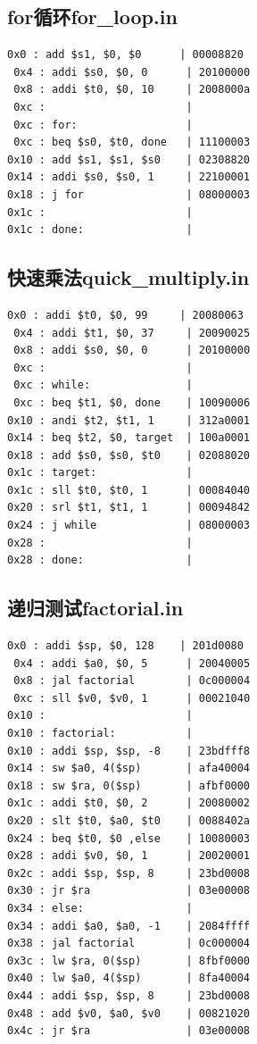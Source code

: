 \documentclass[twocolumn]{article} %
\begin{document}
\begin{sloppypar}
\subsection{for循环for\_loop.in}

\begin{lstlisting}[]   
 0x0 : add $s1, $0, $0      | 00008820
 0x4 : addi $s0, $0, 0      | 20100000
 0x8 : addi $t0, $0, 10     | 2008000a
 0xc :                      | 
 0xc : for:                 | 
 0xc : beq $s0, $t0, done   | 11100003
0x10 : add $s1, $s1, $s0    | 02308820
0x14 : addi $s0, $s0, 1     | 22100001
0x18 : j for                | 08000003
0x1c :                      | 
0x1c : done:                | 
\end{lstlisting}  

\subsection{{\color{red} 快速乘法quick\_multiply.in}}

\begin{lstlisting}[]  
 0x0 : addi $t0, $0, 99     | 20080063
 0x4 : addi $t1, $0, 37     | 20090025
 0x8 : addi $s0, $0, 0      | 20100000
 0xc :                      | 
 0xc : while:               | 
 0xc : beq $t1, $0, done    | 10090006
0x10 : andi $t2, $t1, 1     | 312a0001
0x14 : beq $t2, $0, target  | 100a0001
0x18 : add $s0, $s0, $t0    | 02088020
0x1c : target:              | 
0x1c : sll $t0, $t0, 1      | 00084040
0x20 : srl $t1, $t1, 1      | 00094842
0x24 : j while              | 08000003
0x28 :                      | 
0x28 : done:                | 
\end{lstlisting}  

\subsection{{\color{red} 递归测试factorial.in}}

\begin{lstlisting}[]  
 0x0 : addi $sp, $0, 128    | 201d0080
 0x4 : addi $a0, $0, 5      | 20040005
 0x8 : jal factorial        | 0c000004
 0xc : sll $v0, $v0, 1      | 00021040
0x10 :                      | 
0x10 : factorial:           | 
0x10 : addi $sp, $sp, -8    | 23bdfff8
0x14 : sw $a0, 4($sp)       | afa40004
0x18 : sw $ra, 0($sp)       | afbf0000
0x1c : addi $t0, $0, 2      | 20080002
0x20 : slt $t0, $a0, $t0    | 0088402a
0x24 : beq $t0, $0 ,else    | 10080003
0x28 : addi $v0, $0, 1      | 20020001
0x2c : addi $sp, $sp, 8     | 23bd0008
0x30 : jr $ra               | 03e00008
0x34 : else:                | 
0x34 : addi $a0, $a0, -1    | 2084ffff
0x38 : jal factorial        | 0c000004
0x3c : lw $ra, 0($sp)       | 8fbf0000
0x40 : lw $a0, 4($sp)       | 8fa40004
0x44 : addi $sp, $sp, 8     | 23bd0008
0x48 : add $v0, $a0, $v0    | 00821020
0x4c : jr $ra               | 03e00008
\end{lstlisting}  


\end{sloppypar}
\end{document}
